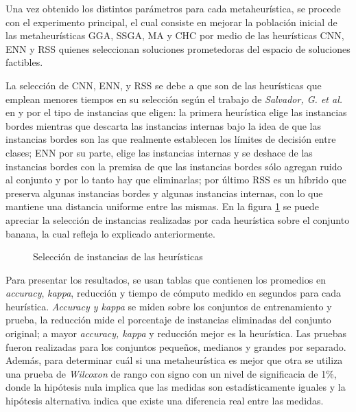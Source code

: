 Una vez obtenido los distintos parámetros para cada metaheurística, se procede con el experimento principal, el cual consiste en mejorar la población inicial de las metaheurísticas GGA, SSGA, MA y CHC por medio de las heurísticas CNN, ENN y RSS quienes seleccionan soluciones prometedoras del espacio de soluciones factibles.

La selección de CNN, ENN, y RSS se debe a que son de las heurísticas que emplean menores tiempos en su selección según el trabajo de \emph{Salvador, G. et al.} en \cite{garcia2012prototype} y por el tipo de instancias que eligen: la primera heurística elige las instancias bordes mientras que descarta las instancias internas bajo la idea de que las instancias bordes son las que realmente establecen los límites de decisión entre clases; ENN por su parte, elige las instancias internas y se deshace de las instancias bordes con la premisa de que las instancias bordes sólo agregan ruido al conjunto y por lo tanto hay que eliminarlas; por último RSS es un híbrido que preserva algunas instancias bordes y algunas instancias internas, con lo que mantiene una distancia uniforme entre las mismas. En la figura \ref{heu} se puede apreciar la selección de instancias realizadas por cada heurística sobre el conjunto banana, la cual refleja lo explicado anteriormente.

\begin{figure}[]

	\centering

\caption{Selección de instancias de las heurísticas}
\label{heu}
\end{figure}


Para presentar los resultados, se usan tablas que contienen los promedios en \emph{accuracy}, \emph{kappa}, reducción y tiempo de cómputo medido en segundos para cada heurística. \emph{Accuracy y kappa} se miden sobre los conjuntos de entrenamiento y prueba, la reducción mide el porcentaje de instancias eliminadas del conjunto original; a mayor \emph{accuracy, kappa} y reducción mejor es la heurística. Las pruebas fueron realizadas para los conjuntos pequeños, medianos y grandes por separado. Además, para determinar cuál si una metaheurística es mejor que otra se utiliza una prueba de \emph{Wilcoxon} de rango con signo con un nivel de significacia de 1\%, donde la hipótesis nula implica que las medidas son estadísticamente iguales y la hipótesis alternativa indica que existe una diferencia real entre las medidas.

